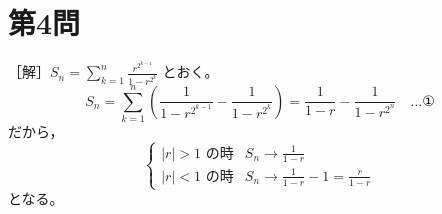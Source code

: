 \documentclass[../main.tex]{subfiles}
\begin{document}
\newpage

\section*{第4問}

［解］$S_n = \sum_{k=1}^n \frac{r^{2^{k-1}}}{1 - r^{2^k}}$ とおく。
\[
  S_n = \sum_{k=1}^n \left( \frac{1}{1 - r^{2^{k-1}}} - \frac{1}{1 - r^{2^k}} \right) = \frac{1}{1-r} - \frac{1}{1 - r^{2^n}} \quad \dots \text{①}
\]
だから，
\[
  \begin{cases}
    |r| > 1 \text{ の時} & S_n \to \frac{1}{1-r} \\[1.5ex]
    |r| < 1 \text{ の時} & S_n \to \frac{1}{1-r} - 1 = \frac{r}{1-r}
  \end{cases}
\]
となる。
\end{document}
